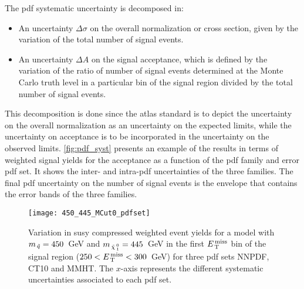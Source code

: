 The \gls{pdf} systematic uncertainty is decomposed in:
\begin{itemize}
\item An uncertainty $\Delta \sigma$ on the overall normalization or cross
  section, given by the variation of the total number of signal events.
\item An uncertainty $\Delta A$ on the signal acceptance, which is defined by
  the variation of the ratio of number of signal events determined at the Monte
  Carlo truth level in a particular bin of the signal region divided by the
  total number of signal events.
\end{itemize}
This decomposition is done since the \gls{atlas} standard is to depict the
uncertainty on the overall normalization as an uncertainty on the expected
limits, while the uncertainty on acceptance is to be incorporated in the
uncertainty on the observed limits. \cref{fig:pdf_syst} presents an example of
the results in terms of weighted signal yields for the acceptance as a function
of the \gls{pdf} family and error \gls{pdf} set. It shows the inter- and
intra-\gls{pdf} uncertainties of the three families. The final \gls{pdf}
uncertainty on the number of signal events is the envelope that contains the
error bands of the three families.
\begin{figure}[!htb]
\centering
\texttt{[image: 450\_445\_MCut0\_pdfset]}
\caption{Variation in \gls{susy} compressed weighted event yields for a model
  with $m_{\, \tilde{q}} = 450$~GeV and $m_{\, \tilde{\chi}_{\, 1}^{\, 0}} = 445$~GeV in the first $E_\mathrm{\, T}^\mathrm{\, miss}$ bin
  of the signal region ($250 < E_\mathrm{\, T}^\mathrm{\, miss} < 300$~GeV) for three \gls{pdf} sets NNPDF,
  CT10 and MMHT. The $x$-axis represents the different systematic uncertainties
  associated to each \gls{pdf} set.}
\label{fig:susy_pdfsysts}
\end{figure}

